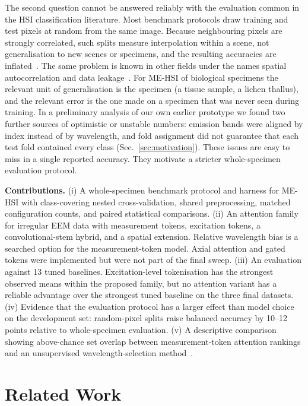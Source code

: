 \documentclass[journal]{IEEEtran}
\begin{document}
The second question cannot be answered reliably with the evaluation common in the HSI classification literature. Most benchmark protocols draw training and test pixels at random from the same image. Because neighbouring pixels are strongly correlated, such splits measure interpolation within a scene, not generalisation to new scenes or specimens, and the resulting accuracies are inflated~\cite{liang2017sampling,nalepa2019validating}. The same problem is known in other fields under the names spatial autocorrelation and data leakage~\cite{roberts2017cv,kapoor2023leakage}. For ME-HSI of biological specimens the relevant unit of generalisation is the specimen (a tissue sample, a lichen thallus), and the relevant error is the one made on a specimen that was never seen during training. In a preliminary analysis of our own earlier prototype we found two further sources of optimistic or unstable numbers: emission bands were aligned by index instead of by wavelength, and fold assignment did not guarantee that each test fold contained every class (Sec.~\ref{sec:motivation}). These issues are easy to miss in a single reported accuracy. They motivate a stricter whole-specimen evaluation protocol.

\textbf{Contributions.}
(i) A whole-specimen benchmark protocol and harness for ME-HSI with class-covering nested cross-validation, shared preprocessing, matched configuration counts, and paired statistical comparisons.
(ii) An attention family for irregular EEM data with measurement tokens, excitation tokens, a convolutional-stem hybrid, and a spatial extension. Relative wavelength bias is a searched option for the measurement-token model. Axial attention and gated tokens were implemented but were not part of the final sweep.
(iii) An evaluation against 13 tuned baselines. Excitation-level tokenisation has the strongest observed means within the proposed family, but no attention variant has a reliable advantage over the strongest tuned baseline on the three final datasets.
(iv) Evidence that the evaluation protocol has a larger effect than model choice on the development set: random-pixel splits raise balanced accuracy by 10--12 points relative to whole-specimen evaluation.
(v) A descriptive comparison showing above-chance set overlap between measurement-token attention rankings and an unsupervised wavelength-selection method~\cite{meloyan2026unsupervised}.

\section{Related Work}
\end{document}
